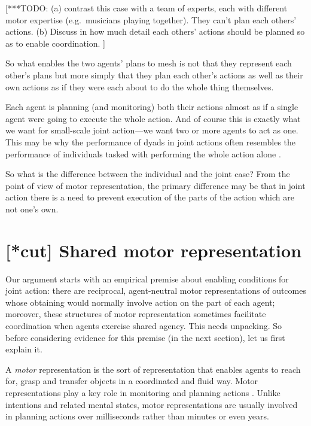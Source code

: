 \documentclass[12pt,\papersize]{extarticle}
\begin{document}
[***TODO: (a) contrast this case with a team of experts, each with different motor expertise (e.g.\ musicians playing together).  
They can't plan each others' actions.
(b) Discuss in how much detail each others' actions should be planned so as to enable coordination.
]


So what enables the two agents' plans to mesh is not that they represent each other's plans but more simply that they plan each other's actions as well as their own actions as if they were each about to do the whole thing themselves.

Each agent is planning (and monitoring) both their actions almost as if a single agent were going to execute the whole action.
And of course this is exactly what we want for small-scale joint action---we want two or more agents to act as one.
This may be why the performance of dyads in joint actions often resembles the performance of individuals tasked with performing the whole action alone \citep{Knoblich:2003nf}.

So what is the difference between the individual and the joint case?  From the point of view of motor representation, the primary difference may be that in joint action there is a need to prevent execution of the parts of the action which are not one’s own.



\section{[*cut] Shared motor representation}
Our argument starts with an empirical premise about enabling conditions for joint action: there are reciprocal, agent-neutral motor representations of outcomes whose obtaining would normally involve action on the part of each agent;
moreover, these structures of motor representation sometimes facilitate coordination when agents exercise shared agency.
This needs unpacking. 
So before considering evidence for this premise (in the next section), let us first explain  it.

A \textit{motor} representation is the sort of representation that enables agents to reach for, grasp and transfer objects in a coordinated and fluid way. 
Motor representations play a key role in monitoring and planning actions  \citep[e.g.][]{wolpert:1995internal, miall:1996_forward,Wilson:2005qu}.
Unlike intentions and related mental states, motor representations are usually involved in planning actions over milliseconds rather than minutes or even years.
\end{document}
